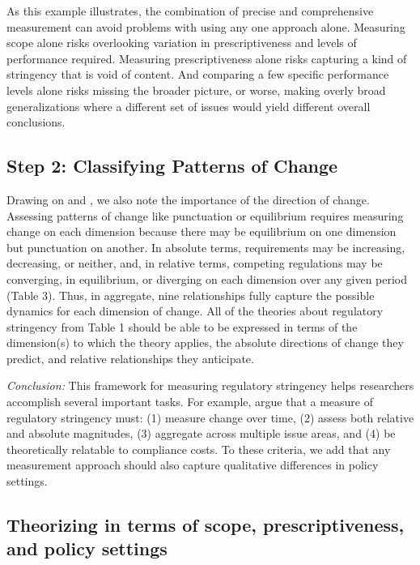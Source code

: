 \documentclass[
      12pt,
            Review ]{article}
\begin{document}
As this example illustrates, the combination of precise and
comprehensive measurement can avoid problems with using any one approach
alone. Measuring scope alone risks overlooking variation in
prescriptiveness and levels of performance required. Measuring
prescriptiveness alone risks capturing a kind of stringency that is void
of content. And comparing a few specific performance levels alone risks
missing the broader picture, or worse, making overly broad
generalizations where a different set of issues would yield different
overall conclusions.

\subsection{Step 2: Classifying Patterns of
Change}\label{step-2-classifying-patterns-of-change}

Drawing on \citet{Baumgartner2002} and \citet{Howlett2007}, we also note
the importance of the direction of change. Assessing patterns of change
like punctuation or equilibrium requires measuring change on each
dimension because there may be equilibrium on one dimension but
punctuation on another. In absolute terms, requirements may be
increasing, decreasing, or neither, and, in relative terms, competing
regulations may be converging, in equilibrium, or diverging on each
dimension over any given period (Table 3). Thus, in aggregate, nine
relationships fully capture the possible dynamics for each dimension of
change. All of the theories about regulatory stringency from Table 1
should be able to be expressed in terms of the dimension(s) to which the
theory applies, the absolute directions of change they predict, and
relative relationships they anticipate.



\emph{Conclusion:} This framework for measuring regulatory stringency
helps researchers accomplish several important tasks. For example,
\citet{Brunel2016} argue that a measure of regulatory stringency must:
(1) measure change over time, (2) assess both relative and absolute
magnitudes, (3) aggregate across multiple issue areas, and (4) be
theoretically relatable to compliance costs. To these criteria, we add
that any measurement approach should also capture qualitative
differences in policy settings.

\subsection{Theorizing in terms of scope, prescriptiveness, and policy
settings}\label{theorizing-in-terms-of-scope-prescriptiveness-and-policy-settings}
\end{document}
